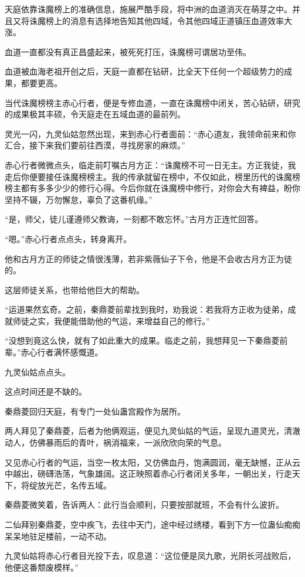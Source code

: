 \begin{this_body}
天庭依靠诛魔榜上的准确信息，施展严酷手段，将中洲的血道消灭在萌芽之中。并且又将诛魔榜上的消息有选择地告知其他四域，令其他四域正道镇压血道效率大涨。

血道一直都没有真正昌盛起来，被死死打压，诛魔榜可谓居功至伟。

血道被血海老祖开创之后，天庭一直都在钻研，比全天下任何一个超级势力的成果，都要更高。

当代诛魔榜榜主赤心行者，便是专修血道，一直在诛魔榜中闭关，苦心钻研，研究的成果极其丰硕，令天庭走在五域血道的最前列。

灵光一闪，九灵仙姑忽然出现，来到赤心行者面前：“赤心道友，我领命前来和你汇合，接下来我们要前往西漠，寻找房家的麻烦。”

赤心行者微微点头，临走前叮嘱古月方正：“诛魔榜不可一日无主。方正我徒，我走后你便要接任诛魔榜榜主。我的传承就留在榜中，不仅如此，榜里历代的诛魔榜榜主都有多多少少的修行心得。今后你就在诛魔榜中修行，对你会大有裨益，盼你坚持不辍，万勿懈怠，辜负了这番机缘。”

“是，师父，徒儿谨遵师父教诲，一刻都不敢忘怀。”古月方正连忙回答。

“嗯。”赤心行者点点头，转身离开。

他和古月方正的师徒之情很浅薄，若非紫薇仙子下令，他是不会收古月方正为徒的。

这层师徒关系，也带给他巨大的帮助。

“运道果然玄奇。之前，秦鼎菱前辈找到我时，劝我说：若我将方正收为徒弟，成就师徒之实，我便能借助他的气运，来增益自己的修行。”

“没想到竟这么快，就有了如此重大的成果。临走之前，我想拜见一下秦鼎菱前辈。”赤心行者满怀感慨道。

九灵仙姑点点头。

这点时间还是不缺的。

秦鼎菱回归天庭，有专门一处仙蛊宫殿作为居所。

两人拜见了秦鼎菱，后者为他俩观运，便见九灵仙姑的气运，呈现九道灵光，清澈动人，仿佛暴雨后的青叶，祸消福来，一派欣欣向荣的气息。

又见赤心行者的气运，当空一枚太阳，又仿佛血丹，饱满圆润，毫无缺憾，正从云中越出，磅礴浩荡，气象雄阔。这正映照着赤心行者闭关多年，一朝出关，行走天下，将绽放光芒，名传五域。

秦鼎菱微笑着，告诉两人：此行当会顺利，只要按部就班，不会有什么波折。

二仙拜别秦鼎菱，空中疾飞，去往中天门，途中经过绣楼，看到下方一位蛊仙痴痴呆呆地驻足楼前，一动不动。

九灵仙姑将赤心行者目光投下去，叹息道：“这位便是凤九歌，光阴长河战败后，他便这番颓废模样。”


\end{this_body}
